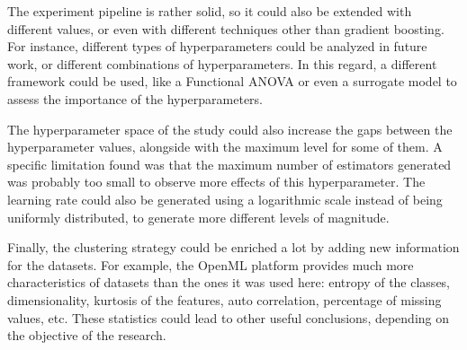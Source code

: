 The experiment pipeline is rather solid, so it could also be extended with different values, or even with different techniques other than gradient boosting. For instance, different types of hyperparameters could be analyzed in future work, or different combinations of hyperparameters. In this regard, a different framework could be used, like a Functional ANOVA or even a surrogate model to assess the importance of the hyperparameters.

The hyperparameter space of the study could also increase the gaps between the hyperparameter values, alongside with the maximum level for some of them. A specific limitation found was that the maximum number of estimators generated was probably too small to observe more effects of this hyperparameter. The learning rate could also be generated using a logarithmic scale instead of being uniformly distributed, to generate more different levels of magnitude.

Finally, the clustering strategy could be enriched a lot by adding new information for the datasets. For example, the OpenML platform provides much more characteristics of datasets than the ones it was used here: entropy of the classes, dimensionality, kurtosis of the features, auto correlation, percentage of missing values, etc. These statistics could lead to other useful conclusions, depending on the objective of the research. 